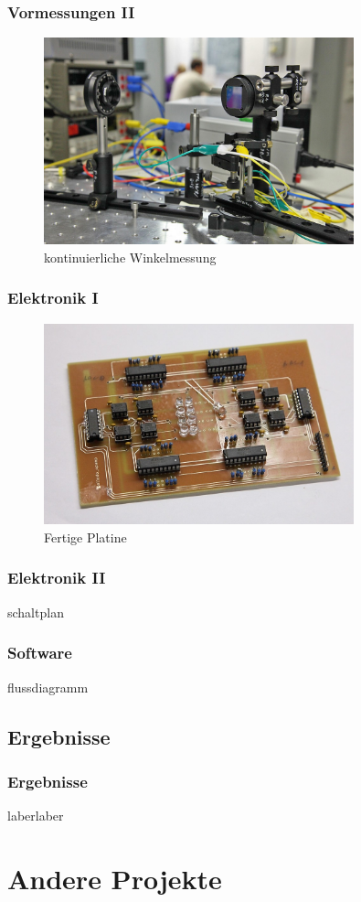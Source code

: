 \documentclass[10pt]{beamer}
\begin{document}
{
\frametitle{Vormessungen II}
\begin{figure}
\begin{center}
\includegraphics[width=0.8\textwidth]{./images/prIMG_7244bh}
\caption{kontinuierliche Winkelmessung}
\end{center}
\end{figure}
}
\frame
{
\frametitle{Elektronik I}
\begin{figure}
\begin{center}
\includegraphics[width=0.8\textwidth]{./images/prIMG_7253crop.jpg}
\caption{Fertige Platine}
\end{center}
\end{figure}
}
\frame
{
\frametitle{Elektronik II}
schaltplan
}
\frame
{
\frametitle{Software}
flussdiagramm
}
\subsection[]{Ergebnisse}
\frame
{
\frametitle{Ergebnisse}
laberlaber
}

\section{Andere Projekte}
\end{document}
